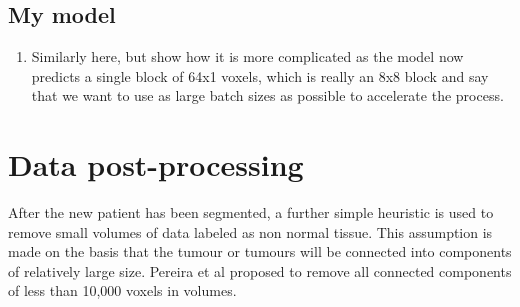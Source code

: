 \documentclass[12pt,a4paper,twoside,openright]{report}
\begin{document}
\subsection{My model}
\begin{enumerate}
	\item Similarly here, but show how it is more complicated as the model now predicts a single block of 64x1 voxels, which is really an 8x8 block and say that we want to use as large batch sizes as possible to accelerate the process.
\end{enumerate}

\section{Data post-processing}
After the new patient has been segmented, a further simple heuristic is used to remove small volumes of data labeled as non normal tissue. This assumption is made on the basis that the tumour or tumours will be connected into components of relatively large size. Pereira et al \cite{pereira} proposed to remove all connected components of less than 10,000 voxels in volumes.
\end{document}
